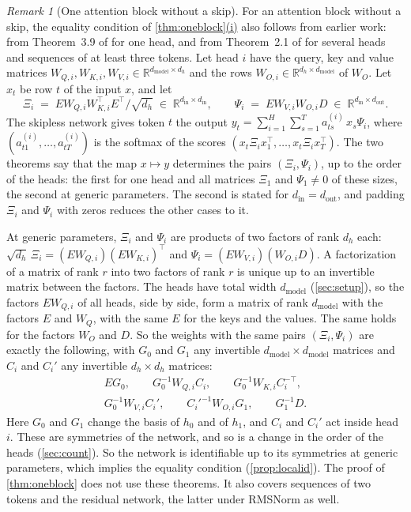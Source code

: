 \documentclass[10pt]{article}
\theoremstyle{definition}
\theoremstyle{remark}
\newtheorem*{remark*}{Remark}
\newcommand{\R}{\mathbb{R}}
\newcommand{\dm}{d_{\mathrm{model}}}
\DeclareRobustCommand{\cpref}[2]{\hyperref[#1:#2]{\cref*{#1}(#2)}}
\begin{document}
\begin{remark*}[One attention block without a skip]
For an attention block without a skip, the equality condition of \cpref{thm:oneblock}{i} also follows from earlier work: from Theorem~3.9 of \citet{henry2025lightning} for one head, and from Theorem~2.1 of \citet{henry2026generic} for several heads and sequences of at least three tokens. Let head $i$ have the query, key and value matrices $W_{Q,i}, W_{K,i}, W_{V,i} \in \R^{\dm\times d_h}$ and the rows $W_{O,i} \in \R^{d_h\times\dm}$ of $W_O$. Let $x_t$ be row $t$ of the input $x$, and let
\[
\Xi_i \;=\; EW_{Q,i}W_{K,i}^\top E^\top\big/\sqrt{d_h} \;\in\; \R^{d_{\mathrm{in}}\times d_{\mathrm{in}}}, \qquad \Psi_i \;=\; EW_{V,i}W_{O,i}D \;\in\; \R^{d_{\mathrm{in}}\times d_{\mathrm{out}}}.
\]
The skipless network gives token $t$ the output $y_t = \sum_{i=1}^{H}\sum_{s=1}^{T} a^{(i)}_{ts}\,x_s\Psi_i$, where $(a^{(i)}_{t1}, \dots, a^{(i)}_{tT})$ is the softmax of the scores $(x_t\Xi_i x_1^\top, \dots, x_t\Xi_i x_T^\top)$. The two theorems say that the map $x \mapsto y$ determines the pairs $(\Xi_i, \Psi_i)$, up to the order of the heads: the first for one head and all matrices $\Xi_1$ and $\Psi_1 \neq 0$ of these sizes, the second at generic parameters. The second is stated for $d_{\mathrm{in}} = d_{\mathrm{out}}$, and padding $\Xi_i$ and $\Psi_i$ with zeros reduces the other cases to it.

At generic parameters, $\Xi_i$ and $\Psi_i$ are products of two factors of rank $d_h$ each: $\sqrt{d_h}\,\Xi_i = (EW_{Q,i})(EW_{K,i})^\top$ and $\Psi_i = (EW_{V,i})(W_{O,i}D)$. A factorization of a matrix of rank $r$ into two factors of rank $r$ is unique up to an invertible matrix between the factors. The heads have total width $\dm$ (\cref{sec:setup}), so the factors $EW_{Q,i}$ of all heads, side by side, form a matrix of rank $\dm$ with the factors $E$ and $W_Q$, with the same $E$ for the keys and the values. The same holds for the factors $W_O$ and $D$. So the weights with the same pairs $(\Xi_i, \Psi_i)$ are exactly the following, with $G_0$ and $G_1$ any invertible $\dm\times\dm$ matrices and $C_i$ and $C_i'$ any invertible $d_h\times d_h$ matrices:
\begin{gather*}
EG_0, \qquad G_0^{-1}W_{Q,i}C_i, \qquad G_0^{-1}W_{K,i}C_i^{-\top}, \\
G_0^{-1}W_{V,i}C_i', \qquad C_i'^{-1}W_{O,i}G_1, \qquad G_1^{-1}D.
\end{gather*}
Here $G_0$ and $G_1$ change the basis of $h_0$ and of $h_1$, and $C_i$ and $C_i'$ act inside head $i$. These are symmetries of the network, and so is a change in the order of the heads (\cref{sec:count}). So the network is identifiable up to its symmetries at generic parameters, which implies the equality condition (\cref{prop:localid}). The proof of \cref{thm:oneblock} does not use these theorems. It also covers sequences of two tokens and the residual network, the latter under RMSNorm as well.
\end{remark*}
\end{document}

